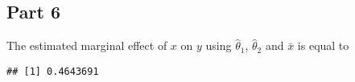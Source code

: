 \documentclass[12pt, a4paper]{article}\usepackage[]{graphicx}\usepackage[]{color}
\makeatletter
\newenvironment{kframe}{%
 \def\at@end@of@kframe{}%
 \ifinner\ifhmode%
  \def\at@end@of@kframe{\end{minipage}}%
  \begin{minipage}{\columnwidth}%
 \fi\fi%
 \def\FrameCommand##1{\hskip\@totalleftmargin \hskip-\fboxsep
 \colorbox{shadecolor}{##1}\hskip-\fboxsep
     \hskip-\linewidth \hskip-\@totalleftmargin \hskip\columnwidth}%
 \MakeFramed {\advance\hsize-\width
   \@totalleftmargin\z@ \linewidth\hsize
   \@setminipage}}%
 {\par\unskip\endMakeFramed%
 \at@end@of@kframe}
\newenvironment{knitrout}{}{} %
\makeatother
\begin{document}
\subsection{Part 6}
The estimated marginal effect of $x$ on $y$ using $\hat{\theta}_1$, $\hat{\theta}_2$ and $\bar{x}$ is equal to
\begin{knitrout}
\color{fgcolor}\begin{kframe}
\begin{verbatim}
## [1] 0.4643691
\end{verbatim}
\end{kframe}
\end{knitrout}
\end{document}
